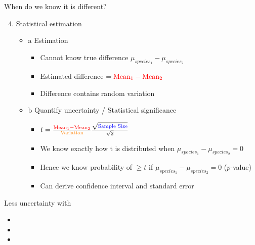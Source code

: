 \documentclass[10pt]{beamer}\usepackage[]{graphicx}\usepackage[]{color}
\begin{document}
\begin{frame}[fragile]{When do we know it is different?}

\begin{enumerate}
  \setcounter{enumi}{3}
  \item Statistical estimation
  \begin{itemize}
    \item a Estimation
      \begin{itemize}
        \item Cannot know true difference $\mu_{species_1} - \mu_{species_2}$
        \item Estimated difference $= \color{red}{\text{Mean}_1 - \text{Mean}_2 }$
        \item Difference contains random variation
      \end{itemize}
    \item b Quantify uncertainty / Statistical significance
      \begin{itemize}
        \item $
      t = \frac{\color{red}{\text{Mean}_1 - \text{Mean}_2}}{\text{\color{orange}Variation}}
      \frac{\sqrt{{\text{\color{blue}{Sample Size}}}}}{\sqrt{2}}
      $
        \item We know exactly how t is distributed when $\mu_{species_1} - \mu_{species_2} = 0$
        \item Hence we know probability of $\geq t$ if $\mu_{species_1} - \mu_{species_2} = 0$ ($p$-value)
        \item Can derive confidence interval and standard error
      \end{itemize}
  \end{itemize}
\end{enumerate}

\pause
Less uncertainty with
  \begin{itemize}
    \item \color{red}{Larger absolute difference}
    \item \color{orange}{Smaller variability}
    \item \color{blue}{Larger sample size}
  \end{itemize}


\end{frame}
  
\end{document}
